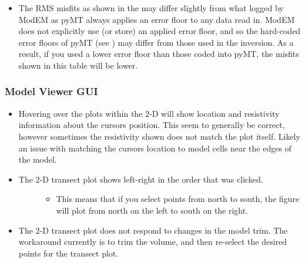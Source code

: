 \documentclass[letterpaper,10pt,english]{sphinxmanual}
\begin{document}
\begin{itemize}
\item {} 
The RMS misfits as shown in the {\hyperref[\detokenize{content/data_plot/main_window:misfit-table}]{}} may differ slightly from what logged by ModEM as pyMT always applies an error floor to any data read in. ModEM does not explicitly use (or store) an applied error floor, and so the hard-coded error floors of pyMT (see {\hyperref[\detokenize{content/api_core/data_structures:error-floors}]{}}) may differ from those used in the inversion. As a result, if you used a lower error floor than those coded into pyMT, the misfits shown in this table will be lower.

\end{itemize}


\subsubsection{Model Viewer GUI}
\label{\detokenize{content/misc/DISCLAIMER:model-viewer-gui}}\begin{itemize}
\item {} 
Hovering over the plots within the 2-D will show location and resistivity information about the cursors position. This seem to generally be correct, however sometimes the resistivity shown does not match the plot itself. Likely an issue with matching the cursors location to model cells near the edges of the model.

\item {} \begin{description}
\item[{The 2-D transect plot shows left-right in the order that was clicked.}] \leavevmode\begin{itemize}
\item {} 
This means that if you select points from north to south, the figure will plot from north on the left to south on the right.

\end{itemize}

\end{description}

\item {} 
The 2-D transect plot does not respond to changes in the model trim. The workaround currently is to trim the volume, and then re-select the desired points for the transect plot.

\end{itemize}
\end{document}
